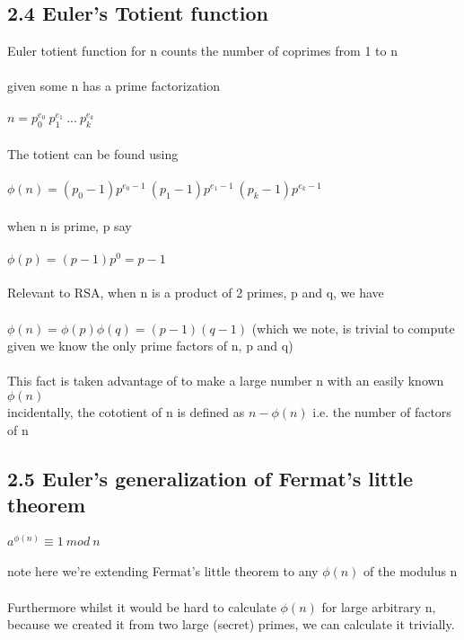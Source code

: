 \documentclass[11pt]{article}   	%
\begin{document}
\subsection*{2.4 Euler's Totient function}

Euler totient function for n counts the number of coprimes from 1 to n \\
\\
given some n has a prime factorization \\
\\
$ n = p_0^{e_0} \ p_1^{e_1} \ ... \ p_k^{e_k} $ \\
\\
The totient can be found using \\
\\
$ \phi(n) = (p_0 - 1)p^{e_0 - 1} \ (p_1 - 1)p^{e_1 - 1} \ (p_k - 1)p^{e_k - 1} $ \\
\\
when n is prime, p say \\
\\
$ \phi(p) = (p-1)p^0 = p - 1 $ \\
\\
Relevant to RSA, when n is a product of 2 primes, p and q, we have \\
\\
$ \phi(n) = \phi(p)\phi(q) = (p-1)(q-1) $ (which we note, is trivial to compute given we know the only prime factors of n, p and q) \\
\\
This fact is taken advantage of to make a large number n with an easily known $ \phi(n) $
\\
incidentally, the cototient of n is defined as $ n - \phi(n) $ i.e. the number of factors of n \\


\subsection*{2.5 Euler’s generalization of Fermat’s little theorem}

$ a^{\phi(n)} \equiv 1 \ mod \ n $ \\
\\
note here we're extending Fermat's little theorem to any $ \phi(n) $ of the modulus n \\
\\
Furthermore whilst it would be hard to calculate $ \phi(n) $ for large arbitrary n, because we created it from two large (secret) primes, we can calculate it trivially.
\end{document}
